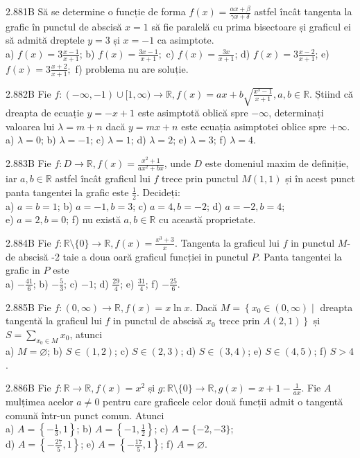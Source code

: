 \documentclass[11pt]{article}
\begin{document}
2.881B Să se determine o funcție de forma $f(x)=\frac{\alpha x+\beta}{\gamma x+\delta}$ astfel încât tangenta la grafic în punctul de abscisă $x=1$ să fie paralelă cu prima bisectoare și graficul ei să admită dreptele $y=3$ și $x=-1$ ca asimptote.\\ a) $f(x)=3 \frac{x-1}{x+1}$; b) $f(x)=\frac{3 x-1}{x+1} ;$ c) $f(x)=\frac{3 x}{x+1}$; d) $f(x)=3 \frac{x-2}{x+1}$; e) $f(x)=3 \frac{x+2}{x+1} ;$ f) problema nu are soluție.

2.882B Fie $f:(-\infty,-1) \cup[1, \infty) \rightarrow \mathbb{R}, f(x)=a x+b \sqrt{\frac{x^{3}-1}{x+1}}, a, b \in \mathbb{R}$. Știind că dreapta de ecuație $y=-x+1$ este asimptotă oblică spre $-\infty$, determinați valoarea lui $\lambda=m+n$ dacă $y=m x+n$ este ecuația asimptotei oblice spre $+\infty$.\\ a) $\lambda=0$; b) $\lambda=-1$; c) $\lambda=1$; d) $\lambda=2$; e) $\lambda=3$; f) $\lambda=4$.

2.883B Fie $f: D \rightarrow \mathbb{R}, f(x)=\frac{x^{2}+1}{a x^{2}+b x}$, unde $D$ este domeniul maxim de definiție, iar $a, b \in \mathbb{R}$ astfel încât graficul lui $f$ trece prin punctul $M(1,1)$ și în acest punct panta tangentei la grafic este $\frac{1}{2}$. Decideți:\\ a) $a=b=1$; b) $a=-1, b=3$; c) $a=4, b=-2$; d) $a=-2, b=4$;\\ e) $a=2, b=0$; f) nu există $a, b \in \mathbb{R}$ cu această proprietate.

2.884B Fie $f: \mathbb{R} \setminus\{0\} \rightarrow \mathbb{R}, f(x)=\frac{x^{3}+3}{x}$. Tangenta la graficul lui $f$ in punctul $M$-de abscisă -2 taie a doua oară graficul funcției in punctul $P$. Panta tangentei la grafic in $P$ este\\ a) $-\frac{41}{6}$; b) $-\frac{5}{3}$; c) $-1$; d) $\frac{29}{4}$; e) $\frac{31}{4}$; f) $-\frac{25}{6}$.

2.885B Fie $f:(0, \infty) \rightarrow \mathbb{R}, f(x)=x \ln x$. Dacă $M=\left\{x_{0} \in(0, \infty) \mid\right.$ dreapta tangentă la graficul lui $f$ in punctul de abscisă $x_{0}$ trece prin $\left.A(2,1)\right\}$ și $S=\sum_{x_{0} \in M} x_{0}$, atunci\\ a) $M=\varnothing$; b) $S \in(1,2)$; c) $S \in(2,3)$; d) $S \in(3,4)$; e) $S \in(4,5)$; f) $S>4$.

2.886B Fie $f: \mathbb{R} \rightarrow \mathbb{R}, f(x)=x^{2}$ și $g: \mathbb{R} \setminus\{0\} \rightarrow \mathbb{R}, g(x)=x+1-\frac{1}{a x}$. Fie $A$ mulțimea acelor $a \neq 0$ pentru care graficele celor două funcții admit o tangentă comună într-un punct comun. Atunci\\ a) $A=\left\{-\frac{1}{3}, 1\right\}$; b) $A=\left\{-1, \frac{1}{2}\right\}$; c) $A=\{-2,-3\}$;\\ d) $A=\left\{-\frac{27}{5}, 1\right\}$; e) $A=\left\{-\frac{17}{5}, 1\right\}$; f) $A=\varnothing$.
\end{document}
